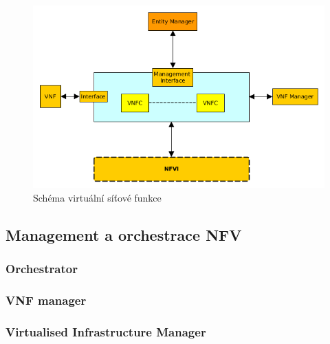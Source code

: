 \begin{figure}[h]
\begin{centering}
\includegraphics[scale=0.65]{images/VNF}
\par\end{centering}
\caption{Schéma virtuální síťové funkce\label{fig:VNF}}
\end{figure}



\subsection{Management a orchestrace NFV}



	\subsubsection{Orchestrator}

	\subsubsection{VNF manager}

	\subsubsection{Virtualised Infrastructure Manager}










